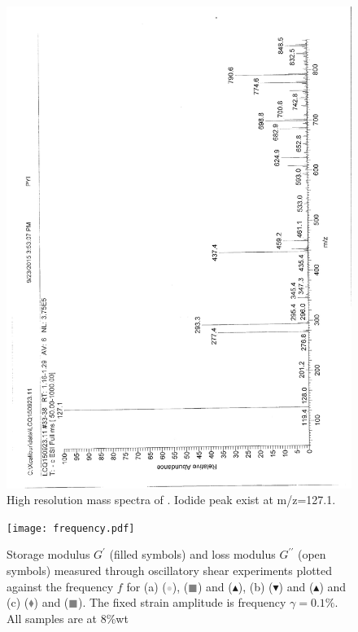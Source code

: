 \documentclass[journal=jacsat,manuscript=article]{achemso}
\begin{document}
\begin{figure}
\includegraphics[height=\textheight-2\baselineskip]{mass_PPyI.png}
\caption{High resolution mass spectra of . Iodide peak exist at m/z=127.1.}
\end{figure}

\begin{figure}
\texttt{[image: frequency.pdf]}
\caption{Storage modulus $G^\prime$ (filled symbols) and loss modulus $G^{\prime\prime}$ (open symbols) measured through oscillatory shear experiments plotted against the frequency $f$ for (a)  (\textcolor{lightgray}{$\bullet$}),  (\textcolor{gray}{$\blacksquare$}) and  ($\blacktriangle$), (b)  ($\blacktriangledown$) and  ($\blacktriangle$) and (c)  (\textcolor{gray}{$\blacklozenge$}) and  (\textcolor{gray}{$\blacksquare$}). The fixed strain amplitude is frequency $\gamma=0.1\%$. All samples are at 8\%wt }
\label{fig:frequency}
\end{figure}
\end{document}
